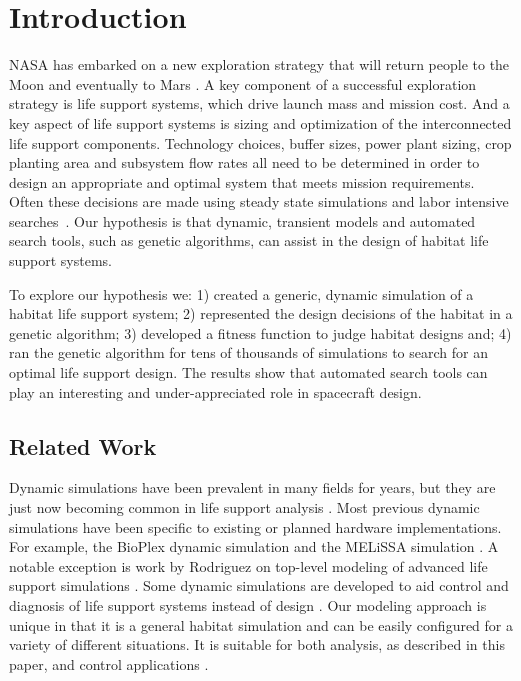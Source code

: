 \documentclass[submit]{aiaa}
\begin{document}
\section{Introduction}

NASA has embarked on a new exploration strategy that will return
people to the Moon and eventually to Mars \cite{nasa_es04}.  A key
component of a successful exploration strategy is life support
systems, which drive launch mass and mission cost.  And a key aspect
of life support systems is sizing and optimization of the
interconnected life support components.  Technology choices, buffer
sizes, power plant sizing, crop planting area and subsystem flow rates
all need to be determined in order to design an appropriate and
optimal system that meets mission requirements.  Often these decisions
are made using steady state simulations and labor intensive searches~\cite{yeh_etal04}.  Our hypothesis is
that dynamic, transient models and automated search tools, such as
genetic algorithms, can assist in the design of habitat life support
systems.

To explore our hypothesis we: 1) created a generic, dynamic simulation
of a habitat life support system; 2) represented the design decisions
of the habitat in a genetic algorithm; 3) developed a fitness function
to judge habitat designs and; 4) ran the genetic algorithm for tens of
thousands of simulations to search for an optimal life support
design.  The results show that automated search tools can play an
interesting and under-appreciated role in spacecraft design.  

\subsection{Related Work}

Dynamic simulations have been prevalent in many fields for years, but
they are just now becoming common in life support analysis
\cite{jones02}.  Most previous dynamic simulations have been specific
to existing or planned hardware implementations.  For example, the
BioPlex dynamic simulation \cite{finn98} and the MELiSSA simulation
\cite{ordonez_etal04}.  A notable exception is work by Rodriguez
on top-level modeling of advanced life support simulations
\cite{rodriguez_etal00}.  Some dynamic simulations are developed to
aid control and diagnosis of life support systems instead of design
\cite{biswas_etal04}.  Our modeling approach is unique in that it is a
general habitat simulation and can be easily configured for a variety
of different situations.  It is suitable for both analysis, as
described in this paper, and control
applications \cite{klien_etal04}. 
\end{document}
